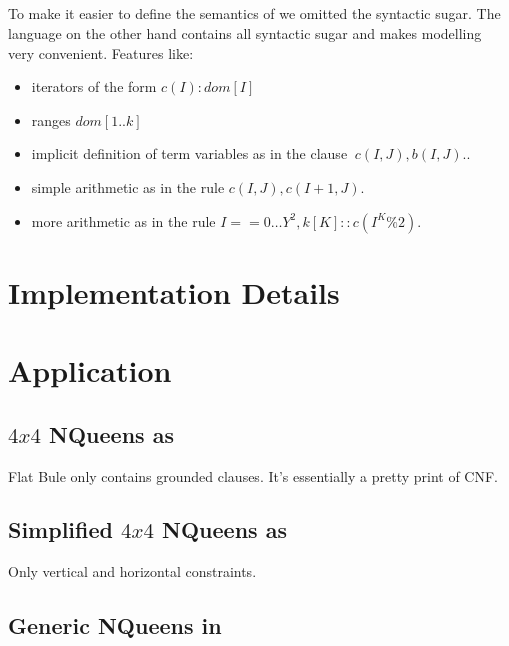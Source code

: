\documentclass[runningheads]{llncs}
\begin{document}
\subsection{\bnice}

To make it easier to define the semantics of \bfull we omitted the syntactic sugar. 
The language \bnice on the other hand contains all syntactic sugar and makes modelling very convenient.  
Features like: 

\begin{itemize}
  \item iterators of the form $c(I):dom[I]$
  \item ranges $dom[1..k]$ 
  \item implicit definition of term variables as in the clause $~c(I,J),b(I,J).$.
  \item simple arithmetic as in the rule $c(I,J),c(I+1,J).$ 
  \item more arithmetic as in the rule $ I== 0 \ldots Y^2, k[K] :: c(I^K\%2).$
\end{itemize}

\section{Implementation Details}


\section{Application}

\subsection{$4x4$ NQueens as \bflat}

Flat Bule only contains grounded clauses. It's essentially a pretty print of CNF.



\subsection{Simplified $4x4$ NQueens as \bcore}

Only vertical and horizontal constraints.



\subsection{Generic NQueens in \bfull}
\end{document}
